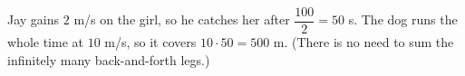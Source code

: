 Jay gains $2$ m/s on the girl, so he catches her after $\dfrac{100}{2}=50$ s. The dog runs the whole time at $10$ m/s, so it covers $10\cdot50=\boxed{500\text{ m}}$. (There is no need to sum the infinitely many back-and-forth legs.)
